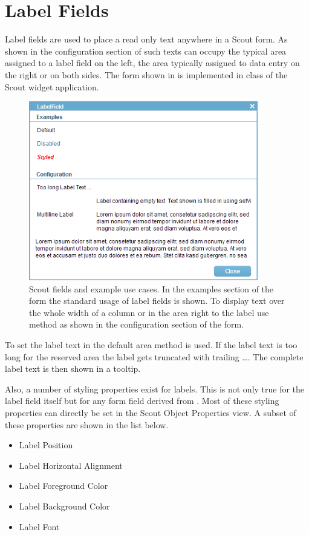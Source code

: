 \documentclass[a4paper,10pt,twoside]{book}
\begin{document}
{\section{Label Fields}

Label fields are used to place a read only text anywhere in a Scout form. 
As shown in the configuration section of  such texts can occupy the typical area assigned to a label field on the left, the area typically assigned to data entry on the right or on both sides.
The form shown in  is implemented in class  of the Scout widget application.

\begin{figure}
\includegraphics[width=10cm]{labelfield.png}
\caption{Scout fields and example use cases. 
In the examples section of the form the standard usage of label fields is shown.
To display text over the whole width of a column or in the area right to the label use method  as shown in the configuration section of the form.}
\end{figure}

To set the label text in the default area method  is used. 
If the label text is too long for the reserved area the label gets truncated with trailing \dots.
The complete label text is then shown in a tooltip.

Also, a number of  styling properties exist for labels.
This is not only true for the label field itself but for any form field derived from .
Most of these styling properties can directly be set in the Scout Object Properties view.
A subset of these properties are shown in the list below.

\begin{itemize}
  \item Label Position
  \item Label Horizontal Alignment
  \item Label Foreground Color
  \item Label Background Color
  \item Label Font
\end{itemize}

}
\end{document}
